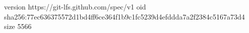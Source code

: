 version https://git-lfs.github.com/spec/v1
oid sha256:77ec636375572d1bd4ff6ce364f1b9c1fc5239d4efddda7a2f2384c5167a73d4
size 5566
